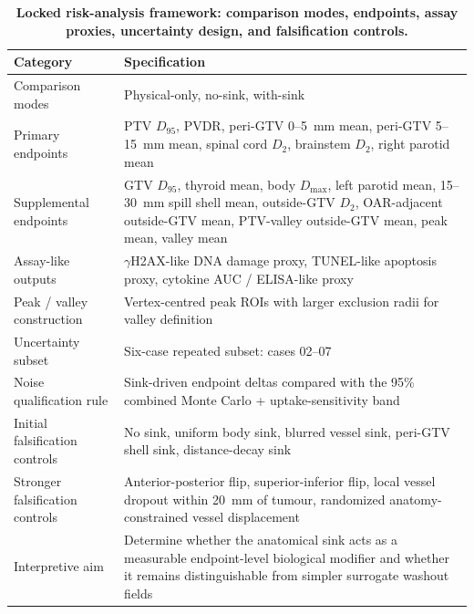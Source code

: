 \begin{table}[H]
\centering
\caption{\textbf{Locked risk-analysis framework: comparison modes, endpoints, assay proxies, uncertainty design, and falsification controls.}}
\label{tab:risk_framework}
\small
\begin{tabular}{p{4.8cm}p{7.9cm}}
\toprule
Category & Specification \\
\midrule
Comparison modes & Physical-only, no-sink, with-sink \\
Primary endpoints & PTV $D_{95}$, PVDR, peri-GTV 0--5~mm mean, peri-GTV 5--15~mm mean, spinal cord $D_{2}$, brainstem $D_{2}$, right parotid mean \\
Supplemental endpoints & GTV $D_{95}$, thyroid mean, body $D_{\max}$, left parotid mean, 15--30~mm spill shell mean, outside-GTV $D_{2}$, OAR-adjacent outside-GTV mean, PTV-valley outside-GTV mean, peak mean, valley mean \\
Assay-like outputs & $\gamma$H2AX-like DNA damage proxy, TUNEL-like apoptosis proxy, cytokine AUC / ELISA-like proxy \\
Peak / valley construction & Vertex-centred peak ROIs with larger exclusion radii for valley definition \\
Uncertainty subset & Six-case repeated subset: cases 02--07 \\
Noise qualification rule & Sink-driven endpoint deltas compared with the 95\% combined Monte Carlo + uptake-sensitivity band \\
Initial falsification controls & No sink, uniform body sink, blurred vessel sink, peri-GTV shell sink, distance-decay sink \\
Stronger falsification controls & Anterior-posterior flip, superior-inferior flip, local vessel dropout within 20~mm of tumour, randomized anatomy-constrained vessel displacement \\
Interpretive aim & Determine whether the anatomical sink acts as a measurable endpoint-level biological modifier and whether it remains distinguishable from simpler surrogate washout fields \\
\bottomrule
\end{tabular}
\end{table}
